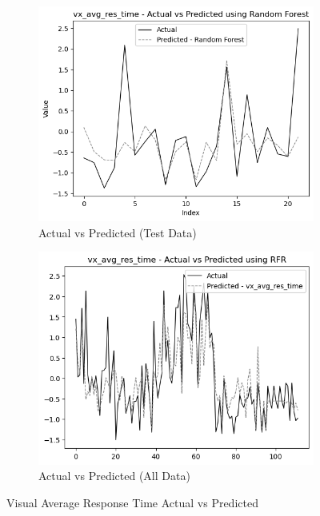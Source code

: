\begin{figure}[htbp]
    \centering
    \begin{subfigure}[b]{0.49\textwidth}
        \centering
        \includegraphics[width=\textwidth]{images/test_data_visual_average_response_time.png}
        \caption{Actual vs Predicted (Test Data)}
        \label{fig:actual_vs_predicted_vx_avg_res_time_test}
    \end{subfigure}\hfill
    \begin{subfigure}[b]{0.49\textwidth}
        \centering
        \includegraphics[width=\textwidth]{images/all_data_visual_average_response_time.png}
        \caption{Actual vs Predicted (All Data)}
        \label{fig:actual_vs_predicted_vx_avg_res_time_all_data}
    \end{subfigure}
    \caption{Visual Average Response Time Actual vs Predicted}
    \label{fig:visual_avg_response_time_comparison}
\end{figure}

